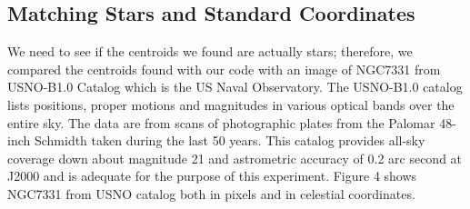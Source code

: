 \documentclass[letterpaper,12pt]{article}
\begin{document}
                                                                                                                                                                                                                                                                                                                                                                                                                                                                                                                                                                                                                                                                                                                                                                                                                                                                                                                                                                                                                                                                         \subsection{Matching Stars and Standard Coordinates}        
We need to see if the centroids we found are actually stars; therefore, we compared the centroids found with our code with an image of NGC7331 from USNO-B1.0 Catalog which is the US Naval Observatory. The USNO-B1.0 catalog lists positions, proper motions and magnitudes in various optical bands over the entire sky. The data are from scans of photographic plates from the Palomar 48-inch Schmidth taken during the last 50 years. This catalog provides all-sky coverage down about magnitude 21 and astrometric accuracy of 0.2 arc second at J2000 and is adequate for the purpose of this experiment. Figure 4 shows NGC7331 from USNO catalog both in pixels and in celestial coordinates.
  
\end{document}
